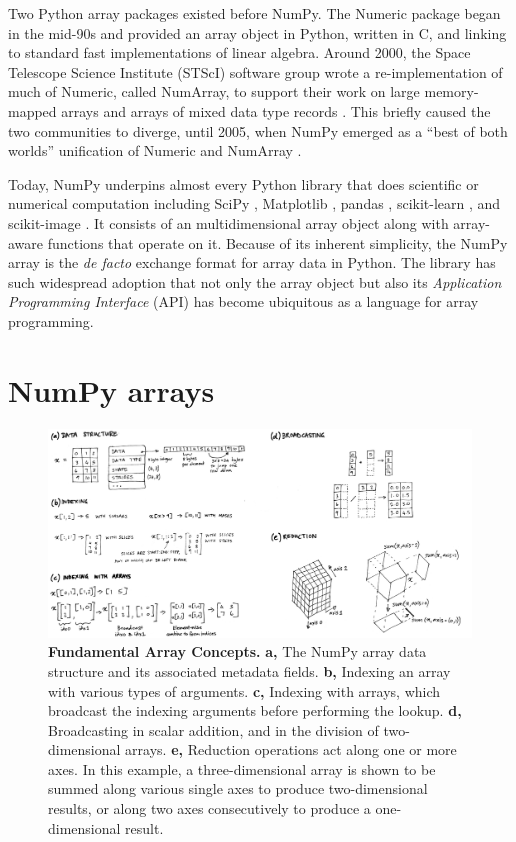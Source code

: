 Two Python array packages existed before NumPy.
The Numeric package began in the mid-90s and provided an array object in
Python, written in C, and linking to standard fast implementations of linear
algebra.
Around 2000, the Space Telescope Science Institute (STScI) software group wrote
a re-implementation of much of Numeric, called NumArray, to support their work
on large memory-mapped arrays and arrays of mixed data type
records \cite{STScI-slither}.
This briefly caused the two communities to diverge, until
2005, when NumPy emerged as a ``best of both worlds'' unification of Numeric
and NumArray \cite{oliphant2006guide}.

Today, NumPy underpins almost every Python library that does scientific or
numerical computation including SciPy \cite{virtanen2019scipy},
Matplotlib \cite{hunter2007matplotlib}, pandas \cite{mckinney-proc-scipy-2010},
scikit-learn \cite{pedregosa2011scikit}, and
scikit-image \cite{vanderwalt2014scikit}.
It consists of an multidimensional array object along with array-aware functions
that operate on it.
Because of its inherent simplicity, the NumPy array is
the {\it de facto} exchange format for array data in Python.
The library has such widespread adoption that not only the array object but also its
{\it Application Programming Interface} (API) has become ubiquitous as
a language for array programming.

\section*{NumPy arrays}

\begin{figure}
  \centering
  \includegraphics[width=\textwidth]{static/sketches/array-concepts}   
  \caption{\textbf{Fundamental Array Concepts.}
    \textbf{a,} The NumPy array data structure and its associated metadata fields.
    \textbf{b,} Indexing an array with various types of arguments.
    \textbf{c,} Indexing with arrays, which broadcast the indexing arguments before performing the lookup.
    \textbf{d,} Broadcasting in scalar addition, and in the division of two-dimensional arrays.
    \textbf{e,} Reduction operations act along one or more axes. In this
    example, a three-dimensional array is shown to be summed along various single
    axes to produce two-dimensional results, or along two axes consecutively to
    produce a one-dimensional result.
   }
  \label{fig:array-concepts}
\end{figure}

